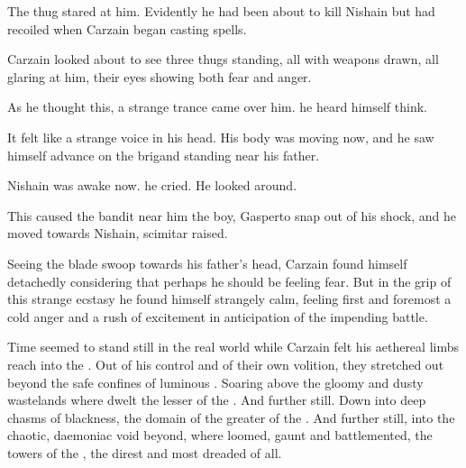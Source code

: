 The thug stared at him. 
Evidently he had been about to kill Nishain but had recoiled when Carzain began casting spells. 

\begin{comment}
\subsubsection{Vizicar awakens}
\end{comment}
Carzain looked about to see three thugs standing, all with weapons drawn, all glaring at him, their eyes showing both fear and anger. 


As he thought this, a strange trance came over him. 
 he heard himself think. 

It felt like a strange voice in his head. 
His body was moving now, and he saw himself advance on the brigand standing near his father. 


Nishain was awake now. 
 he cried. 
He looked around. 

This caused the bandit near him\dash{}
the boy, Gasper\dash{}to snap out of his shock, and he moved towards Nishain, scimitar raised. 

Seeing the blade swoop towards his father's head, Carzain found himself detachedly considering that perhaps he should be feeling fear. 
But in the grip of this strange ecstasy he found himself strangely calm, feeling first and foremost a cold anger and a rush of excitement in anticipation of the impending battle. 


Time seemed to stand still in the real world while Carzain felt his aethereal limbs reach into the \empyrean. 
Out of his control and of their own volition, they stretched out beyond the safe confines of luminous \Iquin{}. 
Soaring above the gloomy and dusty wastelands where dwelt the lesser \qliphoth{} of the . 
And further still. 
Down into deep chasms of blackness, the domain of the greater \qliphoth{} of the . 
And further still, into the chaotic, daemoniac void beyond, where loomed, gaunt and battlemented, the towers of the , the direst and most dreaded \Qliphoth{} of all. 

